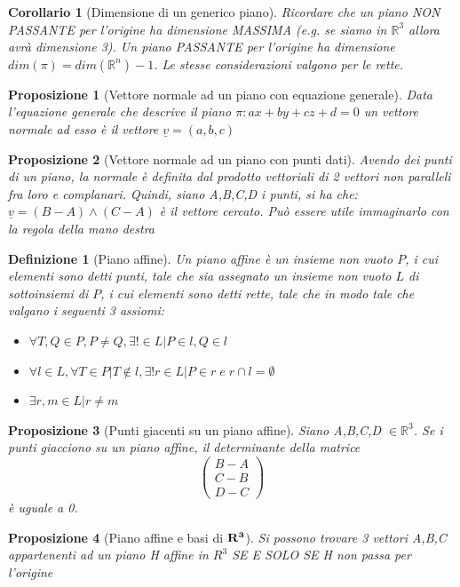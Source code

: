 \documentclass[12pt]{article}
\newenvironment{para}{\begin{adjustwidth}{13mm}{}}{\end{adjustwidth}}
\newtheorem{Definizione}{Definizione}[subsection]
\newtheorem{Corollario}{Corollario}[subsection]
\newtheorem{Proposizione}{Proposizione}[subsection]
\begin{document}
\begin{para}
\begin{Corollario}[Dimensione di un generico piano]
Ricordare che un piano NON PASSANTE per l'origine ha dimensione MASSIMA (e.g. se siamo in $\mathbb{R}^3$ allora avrà dimensione 3). Un piano PASSANTE per l'origine ha dimensione $dim(\pi)=dim(\mathbb{R}^n) -1$. Le stesse considerazioni valgono per le rette.
\end{Corollario}
\begin{Proposizione}[Vettore normale ad un piano con equazione generale]
Data l'equazione generale che descrive il piano $\pi: ax+by+cz+d = 0$ un vettore normale ad esso è il vettore $\underline{v} = (a,b,c)$
\end{Proposizione}
\begin{Proposizione}[Vettore normale ad un piano con punti dati]
Avendo dei punti di un piano, la normale è definita dal prodotto vettoriali di 2 vettori non paralleli fra loro e complanari. Quindi, siano A,B,C,D i punti, si ha che: $\underline{v} = (B-A)\land (C-A)$ è il vettore cercato. Può essere utile immaginarlo con la regola della mano destra
\end{Proposizione}
\begin{Definizione}[Piano affine]
  Un piano affine è un insieme non vuoto $P$, i cui elementi sono detti punti, tale che sia assegnato un insieme non vuoto $L$ di sottoinsiemi di $P$, i cui elementi sono detti rette, tale che in modo tale che valgano i seguenti 3 assiomi:
  \begin{itemize}
      \item $\forall T,Q \in P, P \neq Q, \exists!\in L | P\in l, Q \in l$
      \item $\forall l \in L, \forall T \in P | T \notin l, \exists!r \in L | P \in r \; e \; r \cap l = \emptyset$
      \item $\exists r,m \in L | r \neq m$
  \end{itemize}
\end{Definizione}
\begin{Proposizione}[Punti giacenti su un piano affine]
Siano A,B,C,D $\in \mathbb{R}^3$. Se i punti giacciono su un piano affine, il determinante della matrice $$\begin{pmatrix}
    B-A \\
    C-B \\
    D-C
\end{pmatrix}$$ è uguale a 0.
\end{Proposizione}
\begin{Proposizione}[Piano affine e basi di $\bold{R^3}$]
Si possono trovare 3 vettori A,B,C appartenenti ad un piano H affine in $R^3$ SE E SOLO SE H non passa per l'origine
\end{Proposizione}

\end{para}
\end{document}
